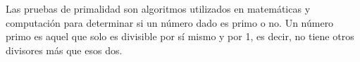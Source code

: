 Las pruebas de primalidad son algoritmos utilizados en matemáticas y computación para determinar si un número dado es primo o no. Un número primo es aquel que solo es divisible por sí mismo y por 1, es decir, no tiene otros divisores más que esos dos.



